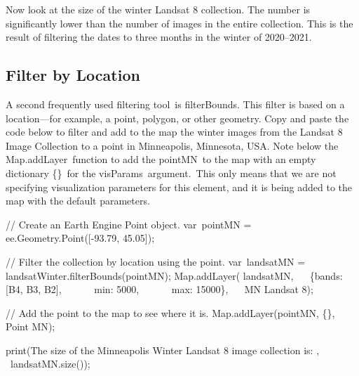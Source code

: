 \documentclass[
  letterpaper,
  DIV=11,
  numbers=noendperiod]{scrreprt}
\newenvironment{Shaded}{\begin{snugshade}}{\end{snugshade}}
\newcommand{\AttributeTok}[1]{\textcolor[rgb]{0.40,0.45,0.13}{#1}}
\newcommand{\BuiltInTok}[1]{\textcolor[rgb]{0.00,0.23,0.31}{#1}}
\newcommand{\CommentTok}[1]{\textcolor[rgb]{0.37,0.37,0.37}{#1}}
\newcommand{\DataTypeTok}[1]{\textcolor[rgb]{0.68,0.00,0.00}{#1}}
\newcommand{\DecValTok}[1]{\textcolor[rgb]{0.68,0.00,0.00}{#1}}
\newcommand{\FloatTok}[1]{\textcolor[rgb]{0.68,0.00,0.00}{#1}}
\newcommand{\FunctionTok}[1]{\textcolor[rgb]{0.28,0.35,0.67}{#1}}
\newcommand{\NormalTok}[1]{\textcolor[rgb]{0.00,0.23,0.31}{#1}}
\newcommand{\OperatorTok}[1]{\textcolor[rgb]{0.37,0.37,0.37}{#1}}
\newcommand{\StringTok}[1]{\textcolor[rgb]{0.13,0.47,0.30}{#1}}
\begin{document}
Now look at the size of the winter Landsat 8 collection. The number is
significantly lower than the number of images in the entire collection.
This is the result of filtering the dates to three months in the winter
of 2020--2021.

\hypertarget{filter-by-location}{%
\subsection{Filter by Location}\label{filter-by-location}}

A second frequently used filtering tool~is filterBounds. This filter is
based on a location---for example, a point, polygon, or other geometry.
Copy and paste the code below to filter and add to the map the winter
images from the Landsat 8 Image Collection to a point in Minneapolis,
Minnesota, USA. Note below the Map.addLayer~function to add the
pointMN~to the map with an empty dictionary \{\}~for the
visParams~argument.~This only means that we are not specifying
visualization parameters for this element, and it is being added to the
map with the default parameters.

\begin{Shaded}
\begin{Highlighting}[]
\CommentTok{// Create an Earth Engine Point object.  }
\NormalTok{var pointMN }\OperatorTok{=}\NormalTok{ ee}\OperatorTok{.}\AttributeTok{Geometry}\OperatorTok{.}\FunctionTok{Point}\NormalTok{([}\OperatorTok{{-}}\FloatTok{93.79}\OperatorTok{,} \FloatTok{45.05}\NormalTok{])}\OperatorTok{;}  
  
\CommentTok{// Filter the collection by location using the point.  }
\NormalTok{var landsatMN }\OperatorTok{=}\NormalTok{ landsatWinter}\OperatorTok{.}\FunctionTok{filterBounds}\NormalTok{(pointMN)}\OperatorTok{;}  
\BuiltInTok{Map}\OperatorTok{.}\FunctionTok{addLayer}\NormalTok{(}
\NormalTok{    landsatMN}\OperatorTok{,}  
\NormalTok{   \{}\DataTypeTok{bands}\OperatorTok{:}\NormalTok{ [}\StringTok{\textquotesingle{}B4\textquotesingle{}}\OperatorTok{,} \StringTok{\textquotesingle{}B3\textquotesingle{}}\OperatorTok{,} \StringTok{\textquotesingle{}B2\textquotesingle{}}\NormalTok{]}\OperatorTok{,}  
      \DataTypeTok{ min}\OperatorTok{:} \DecValTok{5000}\OperatorTok{,}  
      \DataTypeTok{ max}\OperatorTok{:} \DecValTok{15000}\NormalTok{\}}\OperatorTok{,}   
    \StringTok{\textquotesingle{}MN Landsat 8\textquotesingle{}}\NormalTok{)}\OperatorTok{;}  
  
\CommentTok{// Add the point to the map to see where it is.  }
\BuiltInTok{Map}\OperatorTok{.}\FunctionTok{addLayer}\NormalTok{(pointMN}\OperatorTok{,}\NormalTok{ \{\}}\OperatorTok{,} \StringTok{\textquotesingle{}Point MN\textquotesingle{}}\NormalTok{)}\OperatorTok{;}  
  
\FunctionTok{print}\NormalTok{(}\StringTok{\textquotesingle{}The size of the Minneapolis Winter Landsat 8 image collection is: \textquotesingle{}}\OperatorTok{,}  
\NormalTok{   landsatMN}\OperatorTok{.}\FunctionTok{size}\NormalTok{())}\OperatorTok{;}
\end{Highlighting}
\end{Shaded}
\end{document}
